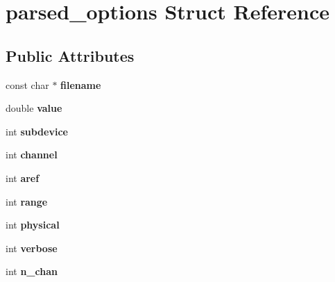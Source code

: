 \hypertarget{structparsed__options}{
\section{parsed\_\-options Struct Reference}
\label{structparsed__options}
}
\subsection*{Public Attributes}
\begin{DoxyCompactItemize}
\item 
\hypertarget{structparsed__options_a68860c43f180d88f18b532c0c97fd428}{
const char $\ast$ {\bfseries filename}}
\label{structparsed__options_a68860c43f180d88f18b532c0c97fd428}

\item 
\hypertarget{structparsed__options_a2a3a9c1b89095d4f07dca0f5c18ae8cb}{
double {\bfseries value}}
\label{structparsed__options_a2a3a9c1b89095d4f07dca0f5c18ae8cb}

\item 
\hypertarget{structparsed__options_a5851031b8ba2d7bca699aea4b64b3b39}{
int {\bfseries subdevice}}
\label{structparsed__options_a5851031b8ba2d7bca699aea4b64b3b39}

\item 
\hypertarget{structparsed__options_ad8889fbf9668ed97d634247854b7059b}{
int {\bfseries channel}}
\label{structparsed__options_ad8889fbf9668ed97d634247854b7059b}

\item 
\hypertarget{structparsed__options_a93a745695747bd7427895eaa196c1222}{
int {\bfseries aref}}
\label{structparsed__options_a93a745695747bd7427895eaa196c1222}

\item 
\hypertarget{structparsed__options_a8ab84ad5ebbeee38c827741c6b44485f}{
int {\bfseries range}}
\label{structparsed__options_a8ab84ad5ebbeee38c827741c6b44485f}

\item 
\hypertarget{structparsed__options_ab8f3f481b6369bb3c9237967f072b08d}{
int {\bfseries physical}}
\label{structparsed__options_ab8f3f481b6369bb3c9237967f072b08d}

\item 
\hypertarget{structparsed__options_abf2fef4ee7db9faba65d20ec3e9fdf89}{
int {\bfseries verbose}}
\label{structparsed__options_abf2fef4ee7db9faba65d20ec3e9fdf89}

\item 
\hypertarget{structparsed__options_aa5d27bbebdde8ebac76f026874462dc2}{
int {\bfseries n\_\-chan}}
\label{structparsed__options_aa5d27bbebdde8ebac76f026874462dc2}


\end{DoxyCompactItemize}
